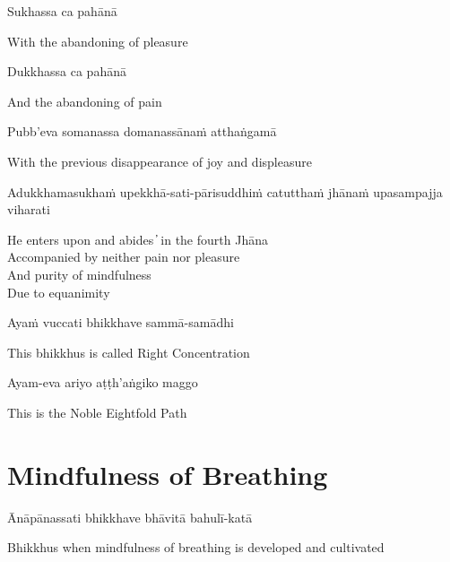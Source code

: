 Sukhassa ca pahānā

\begin{cprenglish}
  With the abandoning of pleasure
\end{cprenglish}

Dukkhassa ca pahānā

\begin{cprenglish}
  And the abandoning of pain
\end{cprenglish}

Pubb’eva somanassa domanassānaṁ atthaṅgamā

\begin{cprenglish}
  With the previous disappearance of joy and displeasure
\end{cprenglish}

Adukkhamasukhaṁ upekkhā-sati-pārisuddhiṁ catutthaṁ jhānaṁ upasampajja viharati

\begin{cprenglish}
  He enters upon and abides  ̓  in the fourth Jhāna\\
  Accompanied by neither pain nor pleasure\\
  And purity of mindfulness\\
  Due to equanimity
\end{cprenglish}

Ayaṁ vuccati bhikkhave sammā-samādhi

\begin{cprenglish}
  This bhikkhus is called Right Concentration
\end{cprenglish}

Ayam-eva ariyo aṭṭh'aṅgiko maggo

\begin{cprenglish}
  This is the Noble Eightfold Path
\end{cprenglish}


\clearpage

\section{Mindfulness of Breathing}

\begin{leader}
\end{leader}

Ānāpānassati bhikkhave bhāvitā bahulī-katā

\begin{cprenglish}
  Bhikkhus when mindfulness of breathing is developed and cultivated
\end{cprenglish}

